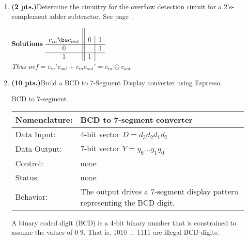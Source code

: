 \begin{enumerate}
        \item \textbf{ (2 pts.)}Determine the circuitry for the overflow detection
            circuit for a 2's-complement adder subtractor.  See page~\pageref{page:Ovf}.

            \begin{onlysolution} \textbf{Solutions} \itshape{
                    $
                    \begin{array} {c||c|c} \\
                        c_{in}  \bs c_{out} & 0 & 1 \\ \hline
                        0    &   & 1 \\ \hline
                        1    & 1 &   \\
                    \end{array}$   \\
                    Thus $ovf = c_{in}' c_{out} + c_{in} c_{out}' =  c_{in} \oplus c_{out} $
                }
            \end{onlysolution}

        \item \textbf{ (10 pts.)}Build a BCD to 7-Segment Display converter using
            Espresso.

            \begin{buildingblock}{BCD to 7-segment}
                \label{page:7seg}
                \begin{tabular}{|l|p{3.5in}|} \hline
                    Nomenclature:  & BCD to 7-segment converter                \\ \hline
                    Data Input:    & 4-bit vector $D=d_3 d_2 d_1 d_0$  \\ \hline
                    Data Output:   & 7-bit vector $Y=y_6 \ldots y_1 y_0$    \\ \hline
                    Control:       & none                                   \\ \hline
                    Status:        & none                                   \\ \hline
                    Behavior:      & The output drives a 7-segment display pattern
                    representing the BCD digit.  \\ \hline
                \end{tabular}
            \end{buildingblock}

            A binary coded digit (BCD) is a 4-bit binary number that is constrained
            to assume the values of 0-9. That is, 1010 ... 1111 are illegal BCD digits.


\end{enumerate}
